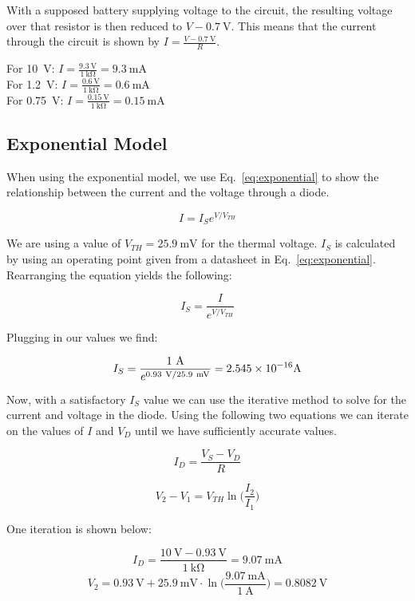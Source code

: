 \documentclass{../../ece-report}
\begin{document}
With a supposed battery supplying voltage to the circuit,
the resulting voltage over that resistor is then reduced
to $V - 0.7~\si{\V}$. This means that the current through the circuit
is shown by $I = \frac{V - 0.7~\si{\V}}{R}$.

For 10~V: $I=\frac{9.3~\si{\V}}{1~\si{\kohm}} = 9.3~\si{\mA}$ \\
For 1.2~V: $I=\frac{0.6~\si{\V}}{1~\si{\kohm}} = 0.6~\si{\mA}$ \\
For 0.75~V: $I=\frac{0.15~\si{\V}}{1~\si{\kohm}} = 0.15~\si{\mA}$

\subsection{Exponential Model}

When using the exponential model, we use Eq.~\ref{eq:exponential}
to show the relationship between the current and the
voltage through a diode.

\begin{equation}
  \label{eq:exponential}
  I = I_S e ^ {V / V_{TH}}
\end{equation}

We are using a value of $V_{TH}=25.9~\si{\mV}$ for the
thermal voltage. $I_S$ is calculated by using an operating
point given from a datasheet in Eq.~\ref{eq:exponential}.
Rearranging the equation yields the following:

\[
  I_S = \frac{I}{e^{V/V_{TH}}}
\]

Plugging in our values we find:

\[
  I_S = \frac{1~\si{\A}}{e^{0.93~\si{\V}/25.9~\si{\mV}}} = \SI{2.545E-16}~\si{\A}
\]

Now, with a satisfactory $I_S$ value we can use the
iterative method to solve for the current and voltage
in the diode. Using the following two equations we can
iterate on the values of $I$ and $V_D$ until we have
sufficiently accurate values.

\begin{equation}
  \label{eq:I_D}
  I_D = \frac{V_S - V_D}{R}
\end{equation}

\begin{equation}
  \label{eq:v1_v2}
  V_2 - V_1 = V_{TH} \ln \Big(\frac{I_2}{I_1}\Big)
\end{equation}

One iteration is shown below:

\[
  I_D = \frac{10~\si{\V} - 0.93~\si{\V}}{1~\si{\kohm}} = 9.07~\si{\mA}
\]
\[
  V_2 = 0.93~\si{\V} + 25.9~\si{\mV} \cdot \ln \Big( \frac{9.07~\si{\mA}}{1~\si{\A}} \Big) = 0.8082~\si{\V}
\]
\end{document}
